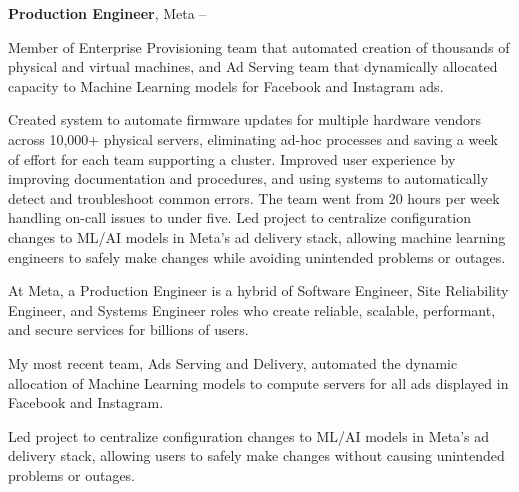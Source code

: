 \documentclass[MMMMyyyy,nonstopmode]{simpleresumecv_stacked}
\begin{document}
\begin{Body}
\Entry
\textbf{Production Engineer}, Meta
\hfill
{} -- 


\Gap
\begin{Detail}
Member of Enterprise Provisioning team that automated creation of thousands of physical and virtual machines,
and Ad Serving team that dynamically allocated capacity to Machine Learning models for Facebook and Instagram ads.

\Gap 

\BulletItem
	Created system to automate firmware updates for multiple hardware vendors across 10,000+ physical servers, eliminating ad-hoc processes and saving a week of effort for each team supporting a cluster.
\BulletItem
	Improved user experience by improving documentation and procedures, and using systems to automatically detect and troubleshoot common errors. The team went from 20 hours per week handling on-call issues to under five.
\BulletItem
	Led project to centralize configuration changes to ML/AI models in Meta’s ad delivery stack, allowing machine learning engineers to safely make changes while avoiding unintended problems or outages.

\iffalse 	%

At Meta, a Production Engineer is a hybrid of Software Engineer, Site Reliability Engineer, and Systems Engineer roles
who create reliable, scalable, performant, and secure services for billions of users.

\Gap

My most recent team, Ads Serving and Delivery, automated the dynamic allocation of Machine Learning models to compute servers for all ads displayed in Facebook and Instagram.

\BulletItem
Led project to centralize configuration changes to ML/AI models in Meta's ad delivery stack, allowing users to safely make changes without causing unintended problems or outages.


\end{Detail}
\end{Body}
\end{document}
